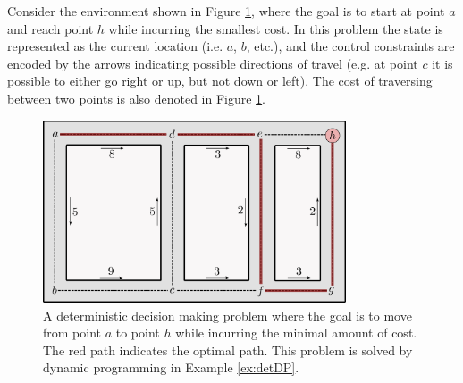 \begin{example} \label{ex:detDP}
\theoremstyle{definition}
Consider the environment shown in Figure \ref{fig:detDPprob}, where the goal is to start at point $a$ and reach point $h$ while incurring the smallest cost. In this problem the state is represented as the current location (i.e. $a$, $b$, etc.), and the control constraints are encoded by the arrows indicating possible directions of travel (e.g. at point $c$ it is possible to either go right or up, but not down or left). The cost of traversing between two points is also denoted in Figure \ref{fig:detDPprob}.
\begin{figure}[ht]
    \centering
    \includegraphics[width=0.8\textwidth]{tex/figs/ch20_figs/dpexample.png}
    \caption{A deterministic decision making problem where the goal is to move from point $a$ to point $h$ while incurring the minimal amount of cost. The red path indicates the optimal path. This problem is solved by dynamic programming in Example \ref{ex:detDP}.}
    \label{fig:detDPprob}
\end{figure}


\end{example}
